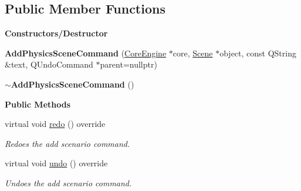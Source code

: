 \subsection*{Public Member Functions}
\begin{Indent}\textbf{ Constructors/\+Destructor}\par
\begin{DoxyCompactItemize}
\item 
\mbox{\label{classrev_1_1_add_physics_scene_command_a9f06942c693dce854f7ffec69647be67}} 
{\bfseries Add\+Physics\+Scene\+Command} (\mbox{\hyperlink{classrev_1_1_core_engine}{Core\+Engine}} $\ast$core, \mbox{\hyperlink{classrev_1_1_scene}{Scene}} $\ast$object, const Q\+String \&text, Q\+Undo\+Command $\ast$parent=nullptr)
\item 
\mbox{\label{classrev_1_1_add_physics_scene_command_a00598e9d6d683458a3e940064420eea8}} 
{\bfseries $\sim$\+Add\+Physics\+Scene\+Command} ()
\end{DoxyCompactItemize}
\end{Indent}
\begin{Indent}\textbf{ Public Methods}\par
\begin{DoxyCompactItemize}
\item 
\mbox{\label{classrev_1_1_add_physics_scene_command_a83662d1ee8efd8d97f1017b37bd7a986}} 
virtual void \mbox{\hyperlink{classrev_1_1_add_physics_scene_command_a83662d1ee8efd8d97f1017b37bd7a986}{redo}} () override
\begin{DoxyCompactList}\small\item\em Redoes the add scenario command. \end{DoxyCompactList}\item 
\mbox{\label{classrev_1_1_add_physics_scene_command_a56b3be06a41077d3b5d33551ce8e7a19}} 
virtual void \mbox{\hyperlink{classrev_1_1_add_physics_scene_command_a56b3be06a41077d3b5d33551ce8e7a19}{undo}} () override
\begin{DoxyCompactList}\small\item\em Undoes the add scenario command. \end{DoxyCompactList}\end{DoxyCompactItemize}
\end{Indent}
